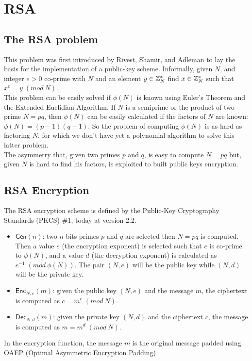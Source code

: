 \section{RSA}
\subsection{The RSA problem}
This problem was first introduced by Rivest, Shamir, and Adleman to lay the basis for the implementation of a public-key scheme. Informally, given $N$, and integer $e > 0$  co-prime with $N$ and an element $y \in \mathbb{Z}_N^{*}$ find $x \in \mathbb{Z}_N^{*}$ such that $x^e = y \; (mod \: N)$.\\
This problem can be easily solved if $\phi(N)$ is known using Euler's Theorem and the Extended Euclidian Algorithm. If $N$ is a semiprime or the product of two prime $N = pq$, then $\phi(N)$ can be easily calculated if the factors of $N$ are known: $\phi(N) = (p-1)(q-1)$. So the problem of computing $\phi(N)$ is as hard as factoring $N$, for which we don't have yet a polynomial algorithm to solve this latter problem.\\
The asymmetry that, given two primes $p$ and $q$, is easy to compute $N = pq$ but, given $N$ is hard to find his factors, is exploited to built public keys encryption.

\subsection{RSA Encryption}
The RSA encryption scheme is defined by the Public-Key Cryptography Standards (PKCS) \#1, today at version 2.2.
\begin{itemize}
    \item{$\mathsf{Gen}(n)$: two $n$-bits primes $p$ and $q$ are selected then $N = pq$ is computed. Then a value $e$ (the encryption exponent) is selected such that $e$ is co-prime to $\phi(N)$, and a value $d$ (the decryption exponent) is calculated as $e^{-1} \; (mod \: \phi(N))$. The pair $(N, e)$ will be the public key while $(N, d)$ will be the private key.}
    \item{$\mathsf{Enc}_{N,e}(m)$: given the public key $(N, e)$ and the message $m$, the ciphertext is computed as $c = m^e \; (mod \: N)$.}
    \item{$\mathsf{Dec}_{N,d}(m)$: given the private key $(N, d)$ and the ciphertext $c$, the message is computed as $m = m^d \; (mod \: N)$.}
\end{itemize}
In the encryption function, the message $m$ is the original message padded using OAEP (Optimal Asymmetric Encryption Padding)
